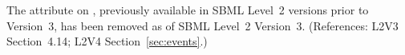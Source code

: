 The  attribute on \Event, previously available in SBML
Level~2 versions prior to Version~3, has been removed as of SBML Level~2
Version~3.  (References: L2V3 Section~4.14; L2V4 Section~\ref{sec:events}.)
